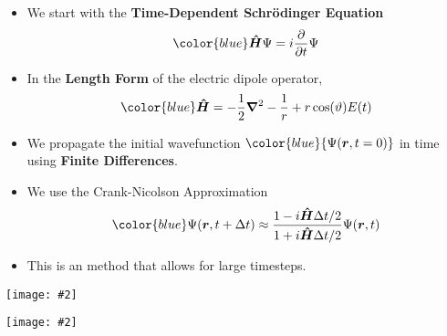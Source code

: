 \documentclass[landscape,a0b,final]{a0poster}
\newenvironment{poster}{
  \begin{center}
  \begin{minipage}[c]{0.98\textwidth}
}{
  \end{minipage} 
  \end{center}
}
\newcommand{\pbox}[4]{
\psshadowbox[#3]{
\begin{minipage}[t][#2][t]{#1}
#4
\end{minipage}
}}
\newcommand{\myfig}[3][0]{
\begin{center}
  \vspace{1.5cm}
  \texttt{[image: \#2]}
  \nobreak\medskip
\end{center}}
\begin{document}
\begin{poster}
\begin{multicols}{3}
\begin{itemize}
\item We start with the {\bf\color{red}Time-Dependent Schr\"{o}dinger Equation}
\begin{equation}
{\color{blue}\bm{\hat{H}}\Psi = i\frac{\partial}{\partial t} \Psi}
\end{equation}
\item {In the \bf\color{red}Length Form} of the electric dipole operator,
\begin{equation}
{\color{blue}\bm{\hat{H}} = -\frac{1}{2} \bm{\nabla}^2 - \frac{1}{r} +r \cos(\vartheta) E(t)}
\end{equation}
\item We propagate the initial wavefunction ${\color{blue}{\Psi(\bm{r},t=0)}}$ in time using {\bf \color{newgreen}Finite Differences}. 
\item We use the {\color{newgreen} Crank-Nicolson Approximation} 
\begin{equation}
{\color{blue}\Psi(\bm{r},t+\Delta t) \approx \frac{1-i\bm{\hat{H}}\Delta t/2}{1+i\bm{\hat{H}}\Delta t/2}\Psi(\bm{r},t)}
\end{equation}
\item This is an {\color{newgreen}{\bf implicit}} method that allows for large timesteps.
\end{itemize}

\vspace{1cm}\begin{center}\pbox{0.8\columnwidth}{}{linewidth=2mm,framearc=0.1,linecolor=lightblue,fillstyle=gradient,
                          gradangle=0,gradbegin=whiteblue,gradend=whiteblue,gradmidpoint=1.0,framesep=1em}{\begin{center}{\Large\bf The Field}\end{center}}\end{center}

  \vspace{-1cm}
  \setlength{\columnsep}{0pt}
  \setlength{\columnseprule}{0pt}
  \hspace{-2cm}
  \begin{multicols}{2}
  \begin{center}
  \myfig{c_pulse_350_2_36_2.ps}{.90}
  \end{center}

  \begin{center}
  \myfig{c_fourier_350_2_36_2.ps}{.90}
  \end{center}
  \end{multicols}


\end{multicols}
\end{poster}
\end{document}

